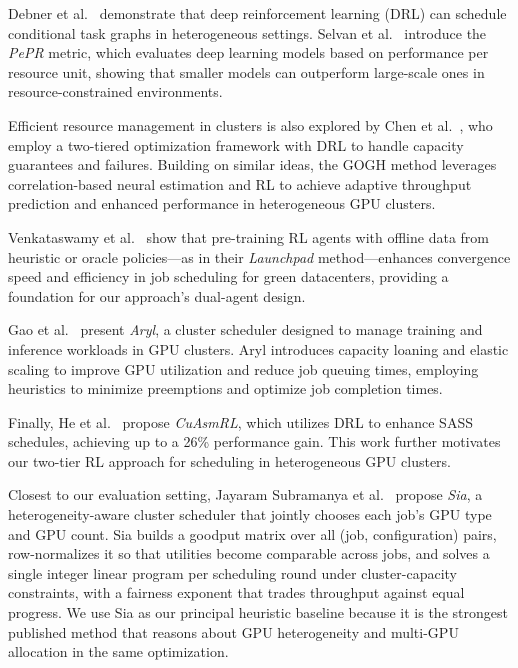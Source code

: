 \documentclass{article}
\begin{document}
Debner et al.~\cite{pmlr-v233-debner24a} demonstrate that deep reinforcement
learning (DRL) can schedule conditional task graphs in heterogeneous settings.
Selvan et al.~\cite{selvan2024pepr} introduce the \emph{PePR} metric, which
evaluates deep learning models based on performance per resource unit, showing
that smaller models can outperform large-scale ones in resource-constrained
environments.

Efficient resource management in clusters is also explored by
Chen et al.~\cite{chen2023two}, who employ a two-tiered optimization framework
with DRL to handle capacity guarantees and failures.  Building on similar
ideas, the GOGH method leverages correlation-based neural estimation and RL to
achieve adaptive throughput prediction and enhanced performance in heterogeneous
GPU clusters.

Venkataswamy et al.~\cite{venkataswamy2022launchpad} show that pre-training RL
agents with offline data from heuristic or oracle policies—as in their
\emph{Launchpad} method—enhances convergence speed and efficiency in job
scheduling for green datacenters, providing a foundation for our
approach’s dual-agent design.

Gao et al.~\cite{gao2022deep} present \emph{Aryl}, a cluster scheduler designed
to manage training and inference workloads in GPU clusters.  Aryl introduces
capacity loaning and elastic scaling to improve GPU utilization and reduce job
queuing times, employing heuristics to minimize preemptions and optimize job
completion times.

Finally, He et al.~\cite{he2025cuasmrl} propose \emph{CuAsmRL}, which utilizes
DRL to enhance SASS schedules, achieving up to a 26\% performance gain.  This
work further motivates our two-tier RL approach for scheduling in heterogeneous
GPU clusters.

Closest to our evaluation setting, Jayaram Subramanya
et al.~\cite{zhong2023sia} propose \emph{Sia}, a heterogeneity-aware cluster
scheduler that jointly chooses each job's GPU type and GPU count.  Sia builds a
goodput matrix over all (job, configuration) pairs, row-normalizes it so that
utilities become comparable across jobs, and solves a single integer linear
program per scheduling round under cluster-capacity constraints, with a
fairness exponent that trades throughput against equal progress.  We use Sia as
our principal heuristic baseline because it is the strongest published method
that reasons about GPU heterogeneity and multi-GPU allocation in the same
optimization.
\end{document}
